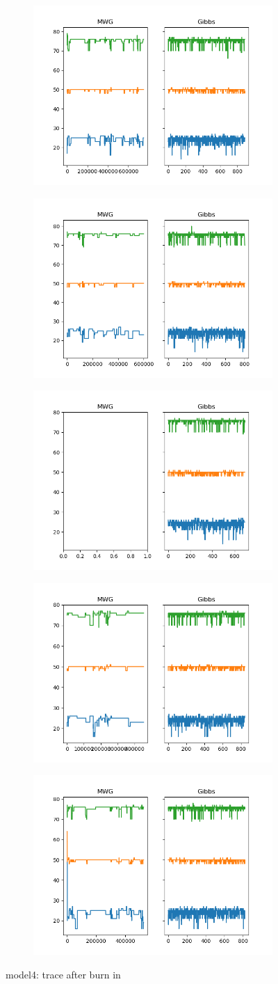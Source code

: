 \begin{figure}[h]
    \centering
    \begin{subfigure}
    	\centering
        \includegraphics[width=0.3\linewidth]{../../plots/Trace_post_burnin_M4_N100_NMCMC3_seed0_diffind2.png}
    \end{subfigure}
    \begin{subfigure}
        \centering
    	\includegraphics[width=0.3\linewidth]{../../plots/Trace_post_burnin_M4_N100_NMCMC3_seed1_diffind2.png}
	\end{subfigure}
	\begin{subfigure}
	    \centering
    	\includegraphics[width=0.3\linewidth]{../../plots/Trace_post_burnin_M4_N100_NMCMC3_seed2_diffind2.png}
	\end{subfigure}
	\begin{subfigure}
	    \centering
    	\includegraphics[width=0.3\linewidth]{../../plots/Trace_post_burnin_M4_N100_NMCMC3_seed3_diffind2.png}
	\end{subfigure}
	\begin{subfigure}
	    \centering
    	\includegraphics[width=0.3\linewidth]{../../plots/Trace_post_burnin_M4_N100_NMCMC3_seed4_diffind2.png}
	\end{subfigure}
	\caption{model4: trace after burn in}
\end{figure}

